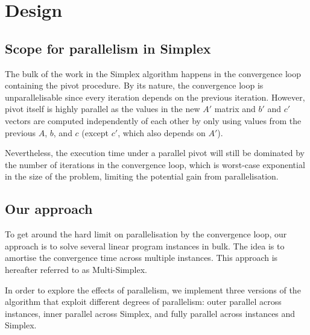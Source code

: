 \section{Design}

\subsection{Scope for parallelism in Simplex}
The bulk of the work in the Simplex algorithm happens in the convergence loop containing the pivot procedure. By its nature, the convergence loop is unparallelisable since every iteration depends on the previous iteration. However, pivot itself is highly parallel as the values in the new $A'$ matrix and $b'$ and $c'$  vectors are computed independently of each other by only using values from the previous $A$, $b$, and $c$ (except $c'$, which also depends on $A'$).

Nevertheless, the execution time under a parallel pivot will still be dominated by the number of iterations in the convergence loop, which is worst-case exponential in the size of the problem, limiting the potential gain from parallelisation.

\subsection{Our approach}
To get around the hard limit on parallelisation by the convergence loop, our approach is to solve several linear program instances in bulk. The idea is to amortise the convergence time across multiple instances. This approach is hereafter referred to as Multi-Simplex.

In order to explore the effects of parallelism, we implement three versions of the algorithm that exploit different degrees of parallelism: outer parallel across instances, inner parallel across Simplex, and fully parallel across instances and Simplex.

